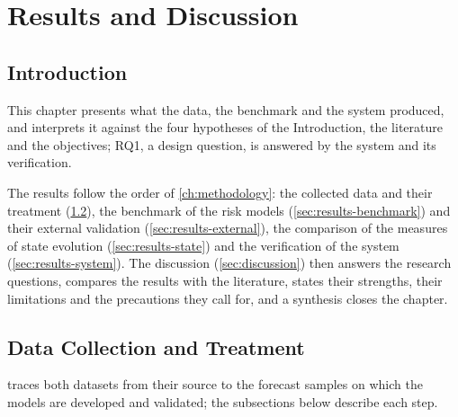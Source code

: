 \chapter{Results and Discussion}\label{ch:results}

\section{Introduction}\label{sec:results-intro}

This chapter presents what the data, the benchmark and the system produced, and interprets it against the four hypotheses of the Introduction, the literature and the objectives; RQ1, a design question, is answered by the system and its verification.

The results follow the order of \cref{ch:methodology}: the collected data and their treatment (\cref{sec:results-data}), the benchmark of the risk models (\cref{sec:results-benchmark}) and their external validation (\cref{sec:results-external}), the comparison of the measures of state evolution (\cref{sec:results-state}) and the verification of the system (\cref{sec:results-system}). The discussion (\cref{sec:discussion}) then answers the research questions, compares the results with the literature, states their strengths, their limitations and the precautions they call for, and a synthesis closes the chapter.

\section{Data Collection and Treatment}\label{sec:results-data}

 traces both datasets from their source to the forecast samples on which the models are developed and validated; the subsections below describe each step.

